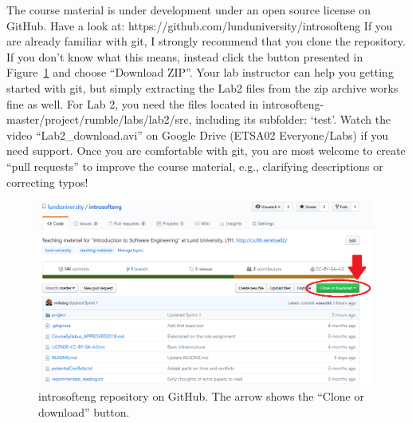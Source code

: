 \documentclass{scrreprt}
\begin{document}
The course material is under development under an open source license on GitHub. Have a look at: https://github.com/lunduniversity/introsofteng
If you are already familiar with git, I strongly recommend that you clone the repository. If you don't know what this means, instead click the button presented in Figure~\ref{fig:github} and choose ``Download ZIP''. Your lab instructor can help you getting started with git, but simply extracting the Lab2 files from the zip archive works fine as well. For Lab 2, you need the files located in introsofteng-master/project/rumble/labs/lab2/src, including its subfolder: `test'. Watch the video ``Lab2_download.avi'' on Google Drive (ETSA02 Everyone/Labs) if you need support. Once you are comfortable with git, you are most welcome to create ``pull requests'' to improve the course material, e.g., clarifying descriptions or correcting typos!

\begin{figure}
\centering
\includegraphics[width=0.99\textwidth]{figures/GitHub.png}
\caption{introsofteng repository on GitHub. The arrow shows the ``Clone or download'' button.}
\label{fig:github}
\end{figure}
\end{document}
